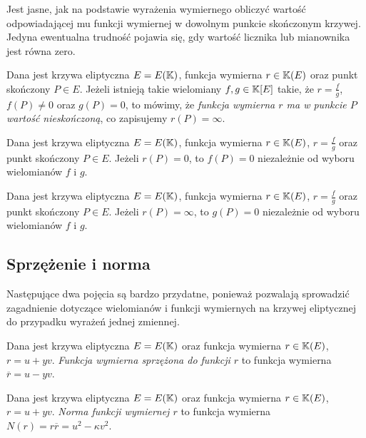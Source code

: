 Jest jasne, jak na podstawie wyrażenia wymiernego
obliczyć wartość odpowiadającej mu funkcji wymiernej
w dowolnym punkcie skończonym krzywej.
Jedyna ewentualna trudność pojawia się,
gdy wartość licznika lub mianownika jest równa zero.

\begin{definition}
Dana jest krzywa eliptyczna $E = E(\mathbb{K})$,
funkcja wymierna $r \in \mathbb{K}(E)$
oraz punkt skończony $P \in E$.
Jeżeli istnieją takie wielomiany $f, g \in \mathbb{K}[E]$ takie,
że $r = \frac{f}{g}$, $f(P) \neq 0$ oraz $g(P) = 0$,
to mówimy,
że \emph{funkcja wymierna $r$ ma w punkcie $P$ wartość nieskończoną},
co zapisujemy $r(P) = \infty$.
\end{definition}

\begin{theorem}
Dana jest krzywa eliptyczna $E = E(\mathbb{K})$,
funkcja wymierna $r \in \mathbb{K}(E)$, $r = \frac{f}{g}$
oraz punkt skończony $P \in E$.
Jeżeli $r(P) = 0$, 
to $f(P) = 0$ niezależnie od wyboru wielomianów $f$ i $g$.
\end{theorem}

\begin{theorem}
Dana jest krzywa eliptyczna $E = E(\mathbb{K})$,
funkcja wymierna $r \in \mathbb{K}(E)$, $r = \frac{f}{g}$
oraz punkt skończony $P \in E$.
Jeżeli $r(P) = \infty$, 
to $g(P) = 0$ niezależnie od wyboru wielomianów $f$ i $g$.
\end{theorem}

\subsection*{Sprzężenie i norma}

Następujące dwa pojęcia są bardzo przydatne,
ponieważ pozwalają sprowadzić
zagadnienie dotyczące wielomianów i funkcji wymiernych na krzywej eliptycznej
do przypadku wyrażeń jednej zmiennej.

\begin{definition}
Dana jest krzywa eliptyczna $E = E(\mathbb{K})$
oraz funkcja wymierna $r \in \mathbb{K}(E)$, $r = u + yv$.
\emph{Funkcja wymierna sprzężona do funkcji $r$}
to funkcja wymierna $\overline{r} = u - yv$.
\end{definition}

\begin{definition}
Dana jest krzywa eliptyczna $E = E(\mathbb{K})$
oraz funkcja wymierna $r \in \mathbb{K}(E)$, $r = u + yv$.
\emph{Norma funkcji wymiernej $r$}
to funkcja wymierna $N(r) = r\overline{r} = u^2 - \kappa v^2$.
\end{definition}

